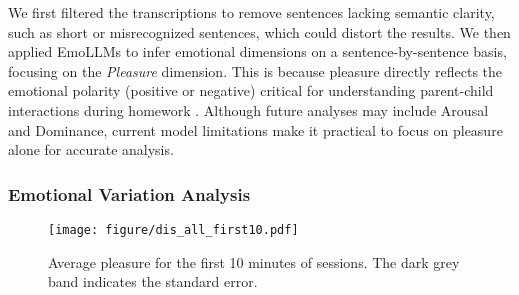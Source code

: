 We first filtered the transcriptions to remove sentences lacking semantic clarity, such as short or misrecognized sentences, which could distort the results. We then applied EmoLLMs to infer emotional dimensions on a sentence-by-sentence basis, focusing on the \textit{Pleasure} dimension. This is because pleasure directly reflects the emotional polarity (positive or negative) critical for understanding parent-child interactions during homework \cite{pekrun2002academic}. Although future analyses may include Arousal and Dominance, current model limitations make it practical to focus on pleasure alone for accurate analysis.



\subsubsection{Emotional Variation Analysis}


\begin{figure}
    \centering
    \texttt{[image: figure/dis\_all\_first10.pdf]}
    \caption{Average pleasure for the first 10 minutes of sessions. The dark grey band indicates the standard error.}
    \label{fig:emotion_all}
\end{figure}

